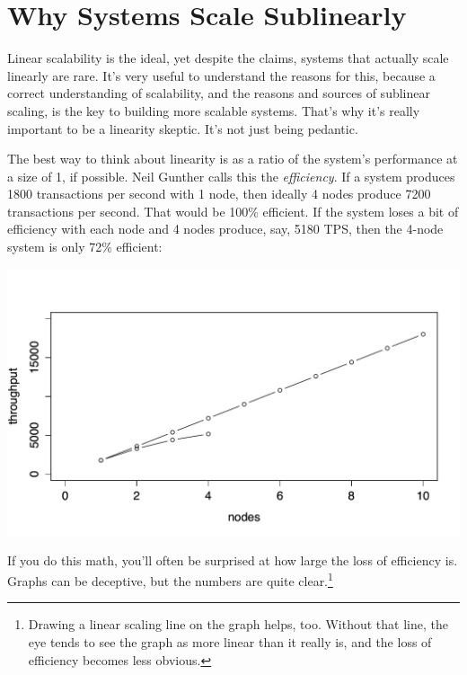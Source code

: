 \documentclass{vivid_layout}
\begin{document}
\section{Why Systems Scale Sublinearly}

Linear scalability is the ideal, yet despite the claims, systems that actually
scale linearly are rare.  It's very useful to understand the reasons for this,
because a correct understanding of scalability, and the reasons and sources of
sublinear scaling, is the key to building more scalable systems.  That's why
it's really important to be a linearity skeptic.  It's not just being pedantic.

The best way to think about linearity is as a ratio of the system's performance
at a size of 1, if possible. Neil Gunther calls this the {\itshape efficiency}.
If a system produces 1800 transactions per second with 1 node, then ideally 4
nodes produce 7200 transactions per second. That would be 100\% efficient. If
the system loses a bit of efficiency with each node and 4 nodes produce, say,
5180 TPS, then the 4-node system is only 72\% efficient:
\begin{center}
\includegraphics[width=.85\linewidth]{scalability/linear2}
\end{center}
If you do this math, you'll often be surprised at how large the loss of
efficiency is.  Graphs can be deceptive, but the numbers are quite
clear.\footnote{Drawing a linear scaling line on the graph helps, too. Without
that line, the eye tends to see the graph as more linear than it really is, and
the loss of efficiency becomes less obvious.}
\end{document}
